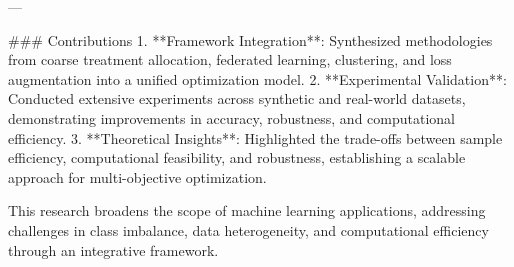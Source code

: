 ---

### Contributions  
1. **Framework Integration**: Synthesized methodologies from coarse treatment allocation, federated learning, clustering, and loss augmentation into a unified optimization model.  
2. **Experimental Validation**: Conducted extensive experiments across synthetic and real-world datasets, demonstrating improvements in accuracy, robustness, and computational efficiency.  
3. **Theoretical Insights**: Highlighted the trade-offs between sample efficiency, computational feasibility, and robustness, establishing a scalable approach for multi-objective optimization.  

This research broadens the scope of machine learning applications, addressing challenges in class imbalance, data heterogeneity, and computational efficiency through an integrative framework.